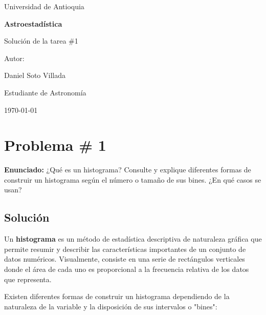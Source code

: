 \documentclass[a4paper]{article}
\begin{document}
\begin{titlepage}
  \centering
  {\Large Universidad de Antioquia\par}
  \vspace{2cm}
  {\huge\bfseries Astroestadística\par}
  \vspace{0.4cm}
  {\Large Solución de la tarea \#1 \par}
  \vspace{2.5cm}
  {\large Autor:\par}
  \vspace{0.2cm}
  {\large Daniel Soto Villada\par}
  {\large Estudiante de Astronomía\par}
  \vfill
  {\large \today\par}
\end{titlepage}

\newpage
\tableofcontents
\newpage

\section{Problema \# 1}
\textbf{Enunciado:}
¿Qué es un histograma? Consulte y explique diferentes formas de construir un histograma según el número o tamaño de sus bines. ¿En qué casos se usan?

\subsection*{Solución}
Un \textbf{histograma} es un método de estadística descriptiva de naturaleza gráfica que permite resumir y describir las características importantes de un conjunto de datos numéricos. Visualmente, consiste en una serie de rectángulos verticales donde el área de cada uno es proporcional a la frecuencia relativa de los datos que representa.

Existen diferentes formas de construir un histograma dependiendo de la naturaleza de la variable y la disposición de sus intervalos o "bines":
\end{document}
